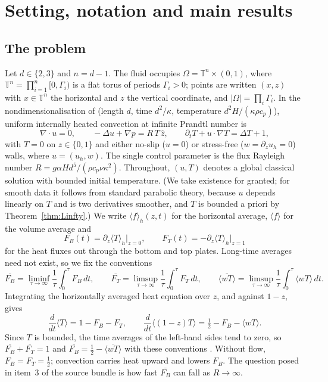 \section{Setting, notation and main results}\label{sec:setting}

\subsection{The problem}
Let $d\in\{2,3\}$ and $n=d-1$. The fluid occupies $\Omega=\mathbb{T}^n\times(0,1)$, where
$\mathbb{T}^n=\prod_{i=1}^n[0,\Gamma_i)$ is a flat torus of periods $\Gamma_i>0$; points are written
$(x,z)$ with $x\in\mathbb{T}^n$ the horizontal and $z$ the vertical coordinate, and
$|\Omega|=\prod_i\Gamma_i$. In the nondimensionalisation of \citet{ArslanRojas2025} (length $d$, time
$d^2/\kappa$, temperature $d^2H/(\kappa\rho c_p)$), uniform internally heated convection at infinite
Prandtl number is
\begin{equation}\label{eq:ihc}
\nabla\cdot u=0,\qquad -\Delta u+\nabla p=R\,T\,\hat z,\qquad
\partial_tT+u\cdot\nabla T=\Delta T+1 ,
\end{equation}
with $T=0$ on $z\in\{0,1\}$ and either no-slip ($u=0$) or stress-free ($w=\partial_z u_h=0$) walls, where
$u=(u_h,w)$. The single control parameter is the flux Rayleigh number $R=g\alpha H d^5/(\rho c_p\nu\kappa^2)$.
Throughout, $(u,T)$ denotes a global classical solution with bounded initial temperature. (We take
existence for granted; for smooth data it follows from standard parabolic theory, because $u$ depends
linearly on $T$ and is two derivatives smoother, and $T$ is bounded a priori by Theorem~\ref{thm:Linfty}.)
We write $\langle f\rangle_h(z,t)$ for the horizontal average, $\langle f\rangle$ for the volume average and
\[
F_B(t)=\partial_z\langle T\rangle_h\big|_{z=0},\qquad F_T(t)=-\partial_z\langle T\rangle_h\big|_{z=1}
\]
for the heat fluxes out through the bottom and top plates. Long-time averages need not exist, so we fix the
conventions
\[
\overline{F_B}=\liminf_{\tau\to\infty}\frac1\tau\int_0^\tau F_B\,dt,\qquad
\overline{F_T}=\limsup_{\tau\to\infty}\frac1\tau\int_0^\tau F_T\,dt,\qquad
\overline{\langle wT\rangle}=\limsup_{\tau\to\infty}\frac1\tau\int_0^\tau \langle wT\rangle\,dt .
\]
Integrating the horizontally averaged heat equation over $z$, and against $1-z$, gives
\begin{equation}\label{eq:identities}
\frac{d}{dt}\langle T\rangle=1-F_B-F_T,\qquad
\frac{d}{dt}\big\langle(1-z)T\big\rangle=\tfrac12-F_B-\langle wT\rangle .
\end{equation}
Since $T$ is bounded, the time averages of the left-hand sides tend to zero, so
$\overline{F_B}+\overline{F_T}=1$ and $\overline{F_B}=\tfrac12-\overline{\langle wT\rangle}$ with these
conventions \citep[cf.][]{Goluskin2016}. Without flow, $F_B=F_T=\tfrac12$; convection carries heat upward and
lowers $F_B$. The question posed in item~3 of the source bundle is how fast $\overline{F_B}$ can fall as
$R\to\infty$.

